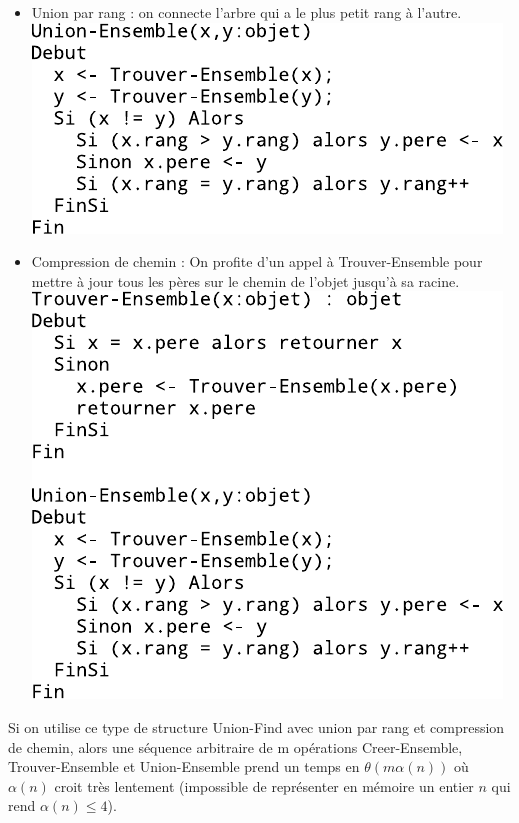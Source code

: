 \begin{itemize}
	\item Union par rang : on connecte l'arbre qui a le plus petit rang à l'autre. \\
\includegraphics{Images/fig5.pdf}\\
	\item Compression de chemin : On profite d'un appel à Trouver-Ensemble pour mettre à jour tous les pères sur le chemin de l'objet jusqu'à sa racine.\\
\includegraphics{Images/fig6.pdf}\\
\end{itemize}

 Si on utilise ce type de structure Union-Find avec union par rang et compression de chemin, alors une séquence arbitraire de m opérations Creer-Ensemble, Trouver-Ensemble et Union-Ensemble prend un temps en $\theta(m\alpha(n))$ où $\alpha(n)$ croit très lentement (impossible de représenter en mémoire un entier $n$ qui rend $\alpha(n) \leq 4$). \\

